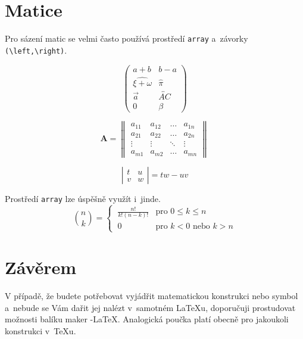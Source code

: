 \documentclass[11pt, a4paper, twocolumn, titlepage] {article}
\theoremstyle{definition}
\begin{document}
\section{Matice}
Pro sázení matic se velmi často používá prostředí \verb|array| a~závorky \verb|(\left,\right)|.

$$ \left( \begin{array}{cc}
a+b & b - a \\
\widehat{\xi + \omega} & \hat\pi\\
\vec{a} & \overleftrightarrow{AC}\\
0 & \beta
\end{array} \right) $$ 
 

$$ \mathbf{A} = \left\|\begin{array}{cccc}
a_{11} & a_{12} & \ldots & a_{1n}\\
a_{21} & a_{22} & \ldots & a_{2n}\\
\vdots & \vdots & \ddots & \vdots\\
a_{m1} & a_{m2} & \ldots & a_{mn}
\end{array}\right\| $$

$$ \left|\begin{array}{cc}
t & u\\ 
v & w
\end{array}\right| = tw - uv $$

Prostředí \verb|array| lze úspěšně využít i~jinde.
$$ \binom{n}{k} = \begin{cases}
\ \frac{n!}{k!(n-k)!} & \text{pro } 0 \leq k \leq n \\
\ 0 & \text{pro } k < 0 \text{ nebo } k > n \end{cases}$$

\section{Závěrem}
V případě, že budete potřebovat vyjádřit matematickou konstrukci nebo symbol a~nebude se Vám dařit jej nalézt v~samotném \LaTeX u, doporučuji prostudovat možnosti balíku maker \AmS -\LaTeX. 
   Analogická poučka platí obecně pro jakoukoli konstrukci v~\TeX u.
\end{document}
